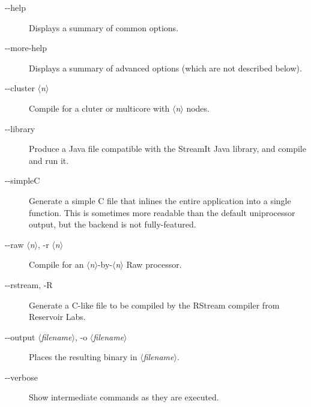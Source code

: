 
\newcommand\metavar[1]{$\langle$\emph{#1}$\rangle$}
\providecommand\filename[1]{\textsf{#1}}
\begin{description}
\item [-{}-help]
Displays a summary of common options.

\item [-{}-more-help]                                                                                                   
Displays a summary of advanced options (which are not described below).

\item[-{}-cluster \metavar{n}]
Compile for a cluter or multicore with \metavar{n} nodes.

\item[-{}-library]
Produce a Java file compatible with the StreamIt Java library,
and compile and run it.

\item[-{}-simpleC]
Generate a simple C file that inlines the entire application into a
single function.  This is sometimes more readable than the default
uniprocessor output, but the backend is not fully-featured.

\item[-{}-raw \metavar{n}, -r \metavar{n}]
Compile for an \metavar{n}-by-\metavar{n} Raw processor.

\item[-{}-rstream, -R]
Generate a C-like file to be compiled by the RStream compiler from
Reservoir Labs.

\item[-{}-output \metavar{filename}, -o \metavar{filename}]
Places the resulting binary in \metavar{filename}.

\item [-{}-verbose]
Show intermediate commands as they are executed.
\end{description}


